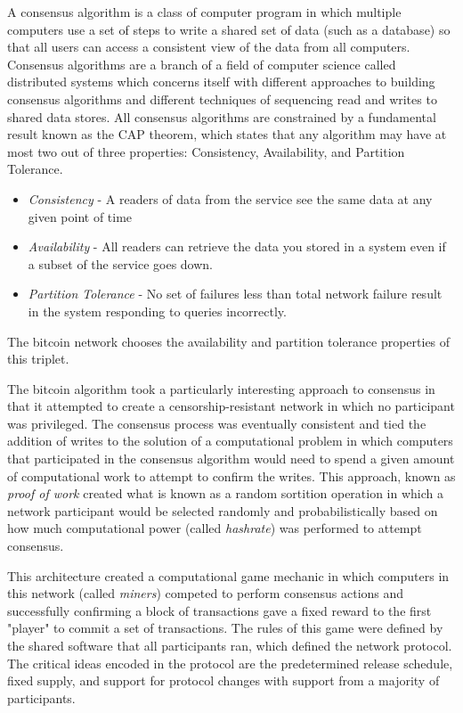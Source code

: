 
A consensus algorithm is a class of computer program in which multiple computers
use a set of steps to write a shared set of data (such as a database) so that
all users can access a consistent view of the data from all computers. Consensus
algorithms are a branch of a field of computer science called distributed
systems which concerns itself with different approaches to building consensus
algorithms and different techniques of sequencing read and writes to shared data
stores. All consensus algorithms are constrained by a fundamental result known
as the CAP theorem, which states that any algorithm may have at most two out of
three properties: Consistency, Availability, and Partition Tolerance.


\begin{itemize}
\tightlist
\item
  \textit{Consistency} - A readers of data from the service see the same data at
any given point of time
\item
  \textit{Availability} - All readers can retrieve the data
you stored in a system even if a subset of the service goes down.
\item
  \textit{Partition Tolerance} - No set of failures less than total network failure
result in the system responding to queries incorrectly.
\end{itemize}

The bitcoin network chooses the availability and partition tolerance properties
of this triplet.

The bitcoin algorithm took a particularly interesting approach to consensus in
that it attempted to create a censorship-resistant network in which no
participant was privileged. The consensus process was eventually consistent and
tied the addition of writes to the solution of a computational problem in which
computers that participated in the consensus algorithm would need to spend a
given amount of computational work to attempt to confirm the writes. This
approach, known as \textit{proof of work} created what is known as a random
sortition operation in which a network participant would be selected randomly
and probabilistically based on how much computational power (called
\textit{hashrate}) was performed to attempt consensus.


This architecture created a computational game mechanic in which computers in
this network (called \textit{miners}) competed to perform consensus actions and
successfully confirming a block of transactions gave a fixed reward to the first
"player" to commit a set of transactions. The rules of this game were defined by
the shared software that all participants ran, which defined the network
protocol. The critical ideas encoded in the protocol are the predetermined
release schedule, fixed supply, and support for protocol changes with support
from a majority of participants.


